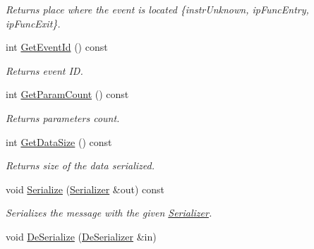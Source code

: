 \begin{DoxyCompactItemize}
\begin{DoxyCompactList}\small\item\em Returns place where the event is located \{instr\-Unknown, ip\-Func\-Entry, ip\-Func\-Exit\}. \end{DoxyCompactList}\item 
\hypertarget{class_common_1_1_event_msg_ac3fdaca51c498c7ee4a91eafc62e0de1}{int \hyperlink{class_common_1_1_event_msg_ac3fdaca51c498c7ee4a91eafc62e0de1}{Get\-Event\-Id} () const }\label{class_common_1_1_event_msg_ac3fdaca51c498c7ee4a91eafc62e0de1}

\begin{DoxyCompactList}\small\item\em Returns event I\-D. \end{DoxyCompactList}\item 
\hypertarget{class_common_1_1_event_msg_a3f36752848f7fb4666f4e7fb6c0693ec}{int \hyperlink{class_common_1_1_event_msg_a3f36752848f7fb4666f4e7fb6c0693ec}{Get\-Param\-Count} () const }\label{class_common_1_1_event_msg_a3f36752848f7fb4666f4e7fb6c0693ec}

\begin{DoxyCompactList}\small\item\em Returns parameters count. \end{DoxyCompactList}\item 
\hypertarget{class_common_1_1_event_msg_af19391509b10c816e1051110c1c0b3d2}{int \hyperlink{class_common_1_1_event_msg_af19391509b10c816e1051110c1c0b3d2}{Get\-Data\-Size} () const }\label{class_common_1_1_event_msg_af19391509b10c816e1051110c1c0b3d2}

\begin{DoxyCompactList}\small\item\em Returns size of the data serialized. \end{DoxyCompactList}\item 
\hypertarget{class_common_1_1_event_msg_a2923792625324b618fd108f19664f444}{void \hyperlink{class_common_1_1_event_msg_a2923792625324b618fd108f19664f444}{Serialize} (\hyperlink{class_common_1_1_serializer}{Serializer} \&out) const }\label{class_common_1_1_event_msg_a2923792625324b618fd108f19664f444}

\begin{DoxyCompactList}\small\item\em Serializes the message with the given \hyperlink{class_common_1_1_serializer}{Serializer}. \end{DoxyCompactList}\item 
\hypertarget{class_common_1_1_event_msg_a404a3fa9bf89678d21551471e29e557b}{void \hyperlink{class_common_1_1_event_msg_a404a3fa9bf89678d21551471e29e557b}{De\-Serialize} (\hyperlink{class_common_1_1_de_serializer}{De\-Serializer} \&in)}\label{class_common_1_1_event_msg_a404a3fa9bf89678d21551471e29e557b}


\end{DoxyCompactItemize}
